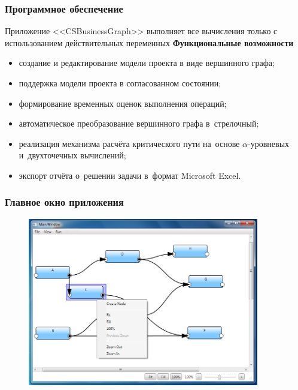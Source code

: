 \documentclass[12pt]{beamer}
\begin{document}
\begin{frame}
  \frametitle{Программное обеспечение}
  Приложение <<CSBusinessGraph>> выполняет все вычисления только с использованием действительных переменных
  \textbf{Функциональные возможности}
  \begin{itemize}
    \item создание и редактирование модели проекта в виде вершинного графа;
    \item поддержка модели проекта в согласованном состоянии;
    \item формирование временных оценок выполнения операций;
    \item автоматическое преобразование вершинного графа в~стрелочный;
    \item реализация механизма расчёта критического пути на~основе $\alpha$-уровневых и~двухточечных вычислений;
    \item экспорт отчёта о~решении задачи в~формат Microsoft Excel.
  \end{itemize}
\end{frame}

\begin{frame}
  \frametitle{Главное окно приложения}
  \begin{figure}
    \center
    \includegraphics[width=0.9\textwidth]{app-sample-graph.png}
  \end{figure}
\end{frame}

\end{document}
